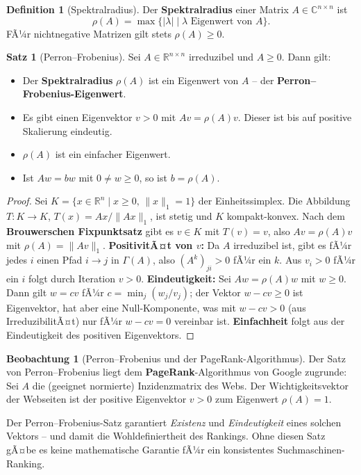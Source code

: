 ﻿\documentclass[a4paper,12pt]{report}
\theoremstyle{definition}
\newtheorem{definition}{Definition}
\newtheorem{satz}{Satz}
\newtheorem{beobachtung}{Beobachtung}
\begin{document}
\begin{definition}[Spektralradius]
    Der \textbf{Spektralradius} einer Matrix $A \in \mathbb{C}^{n \times n}$ ist
    \[
        \rho(A) = \max\{|\lambda| \mid \lambda \text{ Eigenwert von } A\}.
    \]
    FÃ¼r nichtnegative Matrizen gilt stets $\rho(A) \geq 0$.
\end{definition}

\begin{satz}[Perron--Frobenius]
    Sei $A \in \mathbb{R}^{n \times n}$ irreduzibel und $A \geq 0$. Dann gilt:
    \begin{itemize}
        \item[-] Der \textbf{Spek\-tral\-radius} $\rho(A)$ ist ein Eigenwert
              von $A$ -- der \textbf{Perron--Fro\-benius-Eigen\-wert}.
        \item[-] Es gibt einen Eigenvektor $v > 0$ mit $Av = \rho(A) v$.
              Dieser ist bis auf positive Skalierung eindeutig.
        \item[-] $\rho(A)$ ist ein einfacher Eigenwert.
        \item[-] Ist $Aw = bw$ mit $0 \neq w \geq 0$, so ist $b = \rho(A)$.
    \end{itemize}
\end{satz}
\begin{proof}
    Sei $K = \{x \in \mathbb{R}^n \mid x \geq 0,\, \|x\|_1 = 1\}$ der
    Einheitssimplex. Die Abbildung $T : K \to K$, $T(x) = Ax/\|Ax\|_1$,
    ist stetig und $K$ kompakt-konvex. Nach dem \textbf{Brouwerschen Fixpunktsatz}
    gibt es $v \in K$ mit $T(v) = v$, also $Av = \rho(A) v$ mit $\rho(A) = \|Av\|_1$.
    \textbf{PositivitÃ¤t von $v$:} Da $A$ irreduzibel ist, gibt es fÃ¼r jedes $i$
    einen Pfad $i \to j$ in $\Gamma(A)$, also $(A^k)_{ji} > 0$ fÃ¼r ein $k$.
    Aus $v_i > 0$ fÃ¼r ein $i$ folgt durch Iteration $v > 0$.
    \textbf{Eindeutigkeit:} Sei $Aw = \rho(A) w$ mit $w \geq 0$.
    Dann gilt $w = cv$ fÃ¼r $c = \min_j(w_j/v_j)$; der Vektor $w - cv \geq 0$
    ist Eigenvektor, hat aber eine Null-Komponente, was mit $w - cv > 0$
    (aus IrreduzibilitÃ¤t) nur fÃ¼r $w - cv = 0$ vereinbar ist.
    \textbf{Einfachheit} folgt aus der Eindeutigkeit des positiven Eigenvektors.
\end{proof}

\begin{beobachtung}[Perron--Frobenius und der PageRank-Algorithmus]
    Der Satz von Perron--Frobenius liegt dem \textbf{PageRank}-Algorithmus
    von Google zugrunde: Sei $A$ die (geeignet normierte) Inzidenzmatrix des
    Webs. Der Wichtigkeitsvektor der Webseiten ist der positive Eigenvektor
    $v > 0$ zum Eigenwert $\rho(A) = 1$.

    Der Perron--Frobenius-Satz garantiert \emph{Existenz} und
    \emph{Eindeutigkeit} eines solchen Vektors -- und damit die
    Wohldefiniertheit des Rankings. Ohne diesen Satz gÃ¤be es keine
    mathematische Garantie fÃ¼r ein konsistentes Suchmaschinen-Ranking.
\end{beobachtung}
\end{document}
